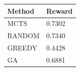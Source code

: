 \begin{tabular}{ll}
\hline
Method & Reward \\
\hline
  MCTS & 0.7302 \\
  RANDOM & 0.7340 \\
  GREEDY & 0.4428 \\
  GA & 0.6881 \\
\hline
\end{tabular}
